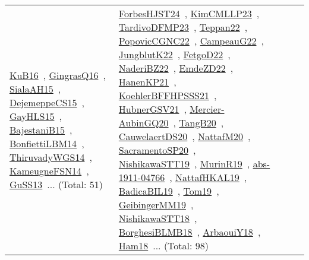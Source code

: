 {\begin{longtable}{lp{3cm}>{\raggedright\arraybackslash}p{6cm}>{\raggedright\arraybackslash}p{6cm}>{\raggedright\arraybackslash}p{8cm}}
\href{works/KuB16.pdf}{KuB16}~\cite{KuB16}, \href{works/GingrasQ16.pdf}{GingrasQ16}~\cite{GingrasQ16}, \href{works/SialaAH15.pdf}{SialaAH15}~\cite{SialaAH15}, \href{works/DejemeppeCS15.pdf}{DejemeppeCS15}~\cite{DejemeppeCS15}, \href{works/GayHLS15.pdf}{GayHLS15}~\cite{GayHLS15}, \href{works/BajestaniB15.pdf}{BajestaniB15}~\cite{BajestaniB15}, \href{works/BonfiettiLBM14.pdf}{BonfiettiLBM14}~\cite{BonfiettiLBM14}, \href{works/ThiruvadyWGS14.pdf}{ThiruvadyWGS14}~\cite{ThiruvadyWGS14}, \href{works/KameugneFSN14.pdf}{KameugneFSN14}~\cite{KameugneFSN14}, \href{works/GuSS13.pdf}{GuSS13}~\cite{GuSS13}... (Total: 51) & \href{works/ForbesHJST24.pdf}{ForbesHJST24}~\cite{ForbesHJST24}, \href{works/KimCMLLP23.pdf}{KimCMLLP23}~\cite{KimCMLLP23}, \href{works/TardivoDFMP23.pdf}{TardivoDFMP23}~\cite{TardivoDFMP23}, \href{works/Teppan22.pdf}{Teppan22}~\cite{Teppan22}, \href{works/PopovicCGNC22.pdf}{PopovicCGNC22}~\cite{PopovicCGNC22}, \href{works/CampeauG22.pdf}{CampeauG22}~\cite{CampeauG22}, \href{works/JungblutK22.pdf}{JungblutK22}~\cite{JungblutK22}, \href{works/FetgoD22.pdf}{FetgoD22}~\cite{FetgoD22}, \href{works/NaderiBZ22.pdf}{NaderiBZ22}~\cite{NaderiBZ22}, \href{works/EmdeZD22.pdf}{EmdeZD22}~\cite{EmdeZD22}, \href{works/HanenKP21.pdf}{HanenKP21}~\cite{HanenKP21}, \href{works/KoehlerBFFHPSSS21.pdf}{KoehlerBFFHPSSS21}~\cite{KoehlerBFFHPSSS21}, \href{works/HubnerGSV21.pdf}{HubnerGSV21}~\cite{HubnerGSV21}, \href{works/Mercier-AubinGQ20.pdf}{Mercier-AubinGQ20}~\cite{Mercier-AubinGQ20}, \href{works/TangB20.pdf}{TangB20}~\cite{TangB20}, \href{works/CauwelaertDS20.pdf}{CauwelaertDS20}~\cite{CauwelaertDS20}, \href{works/NattafM20.pdf}{NattafM20}~\cite{NattafM20}, \href{works/SacramentoSP20.pdf}{SacramentoSP20}~\cite{SacramentoSP20}, \href{works/NishikawaSTT19.pdf}{NishikawaSTT19}~\cite{NishikawaSTT19}, \href{works/MurinR19.pdf}{MurinR19}~\cite{MurinR19}, \href{works/abs-1911-04766.pdf}{abs-1911-04766}~\cite{abs-1911-04766}, \href{works/NattafHKAL19.pdf}{NattafHKAL19}~\cite{NattafHKAL19}, \href{works/BadicaBIL19.pdf}{BadicaBIL19}~\cite{BadicaBIL19}, \href{works/Tom19.pdf}{Tom19}~\cite{Tom19}, \href{works/GeibingerMM19.pdf}{GeibingerMM19}~\cite{GeibingerMM19}, \href{works/NishikawaSTT18.pdf}{NishikawaSTT18}~\cite{NishikawaSTT18}, \href{works/BorghesiBLMB18.pdf}{BorghesiBLMB18}~\cite{BorghesiBLMB18}, \href{works/ArbaouiY18.pdf}{ArbaouiY18}~\cite{ArbaouiY18}, \href{works/Ham18.pdf}{Ham18}~\cite{Ham18}... (Total: 98)\\

\end{longtable}}
